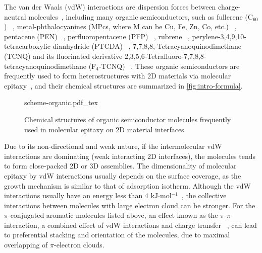 The van der Waals (vdW) interactions are dispersion forces between
charge-neutral molecules~\autocite{Israelachvili_2011_book}, including
many organic semiconductors, such as fullerene (C\(_{\text{60}}\))
~\autocite{Corso_2004_C60_hBN,Kim_2015_c60_gr,Chen_2016_c60_mos2},
metal-phthalo\-cyanines (MPcs, where M can be Cu, Fe, Zn, Co, etc.)
~\autocite{Xiao_2013_jacs_CuPc_gr,Wang_2010_selec_F16_gr,Zhang_2011_FePc_gr,Hamalainen_2012_CoPc_gr_Ir,Ying_Mao_2011_ge_clAlPc,Ogawa_2013_AlCiPc_gr,Pak_2015_CuPc_MoS2,Avvisati_2017_FePc_intercal,Iannuzzi_2014_MPc_hBN_Rh},
pentacene (PEN)
~\autocite{Lee_2011_pentacene,Jariwala_2016_Mos2_pentacene,Shen_2017_DFT_mos2_pent,Kim_2016_trap_Mos2_pent,Nguyen_2015_pent_gr_wett,Betti_2007_orien_pentacene},
perfluoropentacene (PFP)
~\autocite{Salzmann_2012_fpen_gr,Breuer_2016_acnene_mos2}, rubrene
~\autocite{Lee_2014_rubene_hBN}, perylene-3,4,9,10-tetra\-carboxylic
dianhydride (PTCDA)
~\autocite{Wang_2009_STM_PTCDA_Gr,Tian_2010_PTCDA_gr,Huang_2009_PTCDA_gr,Meissner_2012_PTCDA_BLG},
7,7,8,8,-Tetra\-cyanoquino\-dimethane (TCNQ) and its fluorinated
derivative 2,3,5,6-Tetra\-fluoro-7,7,8,8-tetra\-cyanoquino\-dimethane
(F\(_{\text{4}}\)-TCNQ)
~\autocite{Chen_2007_tcnq_gr_transfer,Hong_2013_ftcnq_gr,Stradi_2014_TCNQ_gr_Ru,Tsai_2015_TCNQ_gr_hbn}. These
organic semiconductors are frequently used to form heterostructures
with 2D materials via molecular epitaxy~\autocite{Hara_1989_ME}, and their chemical structures are summarized in \autoref{fig:intro-formula}.

\begin{figure}[h]
  \centering
  {scheme-organic.pdf_tex}
  \caption{%
    \label{fig:intro-formula}
    Chemical structures of organic semiconductor molecules frequently
    used in molecular epitaxy on 2D material interfaces }
\end{figure}

Due to its non-directional and weak nature, if the
intermolecular vdW interactions are dominating (\ie weak
interacting 2D interfaces), the molecules tends to form close-packed
2D or 3D assemblies. The dimensionality of molecular
epitaxy by vdW interactions usually depends on the surface
coverage, as the  growth mechanism is similar to that of
adsorption isotherm. Although the vdW interactions usually have an
energy less than 4 kJ\(\cdot\)mol\(^{-1}\)~\autocite{Israelachvili_2011_book}, the collective
interactions between molecules with large electron cloud can be
stronger. For the \(\pi\)-conjugated aromatic molecules listed above,
an effect known as the \(\pi\)-\(\pi\) interaction, a combined effect
of vdW interactions and charge transfer ~\autocite{Hunter_1990_pi,Ortmann_2005_long_range}, can
lead to preferential stacking and orientation of the molecules, due to
maximal overlapping of \(\pi\)-electron clouds.


